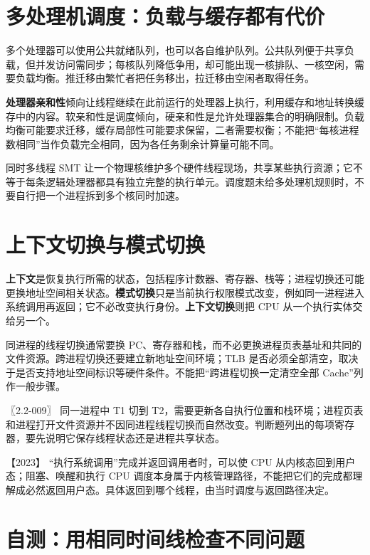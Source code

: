 \section{多处理机调度：负载与缓存都有代价}\label{os-2-9}

多个处理器可以使用公共就绪队列，也可以各自维护队列。公共队列便于共享负载，但并发访问需同步；每核队列降低争用，却可能出现一核排队、一核空闲，需要负载均衡。推迁移由繁忙者把任务移出，拉迁移由空闲者取得任务。

\textbf{处理器亲和性}倾向让线程继续在此前运行的处理器上执行，利用缓存和地址转换缓存中的内容。软亲和性是调度倾向，硬亲和性是允许处理器集合的明确限制。负载均衡可能要求迁移，缓存局部性可能要求保留，二者需要权衡；不能把``每核进程数相同''当作负载完全相同，因为各任务剩余计算量可能不同。

同时多线程 SMT 让一个物理核维护多个硬件线程现场，共享某些执行资源；它不等于每条逻辑处理器都具有独立完整的执行单元。调度题未给多处理机规则时，不要自行把一个进程拆到多个核同时加速。

\section{上下文切换与模式切换}\label{os-2-10}

\textbf{上下文}是恢复执行所需的状态，包括程序计数器、寄存器、栈等；进程切换还可能更换地址空间相关状态。\textbf{模式切换}只是当前执行权限模式改变，例如同一进程进入系统调用再返回；它不必改变执行身份。\textbf{上下文切换}则把 CPU 从一个执行实体交给另一个。

同进程的线程切换通常要换 PC、寄存器和栈，而不必更换进程页表基址和共同的文件资源。跨进程切换还要建立新地址空间环境；TLB 是否必须全部清空，取决于是否支持地址空间标识等硬件条件。不能把``跨进程切换一定清空全部 Cache''列作一般步骤。

\noindent{}〖2.2-009〗 同一进程中 T1 切到 T2，需要更新各自执行位置和栈环境；进程页表和进程打开文件资源并不因同进程线程切换而自然改变。判断题列出的每项寄存器，要先说明它保存线程状态还是进程共享状态。

\noindent{}【2023】 ``执行系统调用''完成并返回调用者时，可以使 CPU 从内核态回到用户态；阻塞、唤醒和执行 CPU 调度本身属于内核管理路径，不能把它们的完成都理解成必然返回用户态。具体返回到哪个线程，由当时调度与返回路径决定。

\section{自测：用相同时间线检查不同问题}\label{os-2-review}

